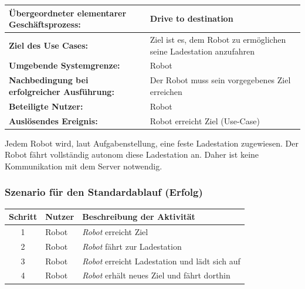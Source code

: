 \documentclass[includeheaders]{scrartcl}
\begin{document}
			\begin{table}[H]
				\centering
				\begin{tabularx}{\textwidth}{@{}p{5cm}X@{}}
				\toprule
				\textbf{Übergeordneter elementarer Geschäftsprozess:} & Drive to destination\\ \midrule
				\textbf{Ziel des Use Cases:} & Ziel ist es, dem Robot zu ermöglichen seine Ladestation anzufahren\\ \midrule
				\textbf{Umgebende Systemgrenze:} & Robot\\ \midrule
				\textbf{Nachbedingung bei erfolgreicher Ausführung:} & Der Robot muss sein vorgegebenes Ziel erreichen\\ \midrule
				\textbf{Beteiligte Nutzer:} & Robot\\ \midrule
				\textbf{Auslösendes Ereignis:} & Robot erreicht Ziel (Use-Case)\\
				\bottomrule
				\end{tabularx}
			\end{table}

			Jedem Robot wird, laut Aufgabenstellung, eine feste Ladestation zugewiesen. Der Robot fährt vollständig autonom diese Ladestation an. Daher ist keine Kommunikation mit dem Server notwendig.

			\subsubsection*{Szenario für den Standardablauf (Erfolg)}

			\begin{table}[H]
				\centering
				\begin{tabularx}{\textwidth}{@{}cp{2cm}X@{}}
				\toprule
				Schritt & Nutzer & Beschreibung der Aktivität \\ \midrule
				1 & Robot & \emph{Robot} erreicht Ziel \\
				2 & Robot & \emph{Robot} fährt zur Ladestation \\
				3 & Robot & \emph{Robot} erreicht Ladestation und lädt sich auf \\
				4 & Robot & \emph{Robot} erhält neues Ziel und fährt dorthin \\
				\bottomrule
				\end{tabularx}
			\end{table}

\end{document}
